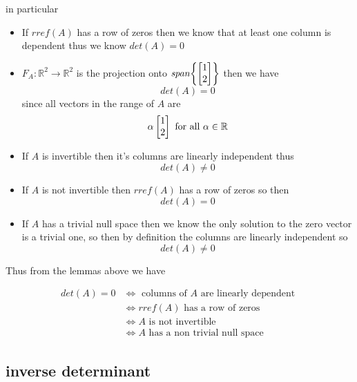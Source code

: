 \documentclass[11pt]{book}
\begin{document}
in particular 
\begin{itemize}
    \item If $\mathit{rref} \left(A\right) $ has a row of zeros then we know that at least one column is dependent thus we know $\boxed{\mathit{det} \left(A\right) = 0}$ 
    \item $F_{A}  : \mathbb{R} ^2  \to \mathbb{R} ^2  $ is the projection onto $\mathit{span} {\left\{ \begin{bmatrix} 1 \\ 2 \end{bmatrix}  \right\} } $ then we have 
        \[
        \boxed{\mathit{det} \left(A\right) = 0 }
        \]
    since all vectors in the range of $A$ are
    \[
    \alpha \begin{bmatrix} 1 \\ 2 \end{bmatrix} \text{ for all  } \alpha \in \mathbb{R} 
    \]
    \item If $A$ is invertible then it's columns are linearly independent thus 
        \[
            \boxed{\mathit{det} \left(A\right) \neq 0}
        \]
    \item If $A$ is not invertible then $\mathit{rref} \left(A\right) $ has a row of zeros so then 
        \[
        \boxed{\mathit{det} \left(A\right) = 0}
        \]
    \item If $A$ has a trivial null space then we know the only solution to the zero vector is a trivial one, so then by definition the columns are linearly independent so 
        \[
        \boxed{\mathit{det} \left(A\right) \neq 0}
        \]
\end{itemize}

Thus from the lemmas above we have 
\begin{thm}\label{thm:determinant_properties_}
    \begin{align*}
        \mathit{det} \left(A\right)= 0 &\Leftrightarrow \text{ columns of $A$ are linearly dependent  } \tag{Important!}\\
                                    &\Leftrightarrow  \mathit{rref} \left(A\right) \text{ has a row of zeros  } \\
                                    & \Leftrightarrow A \text{ is not invertible  } \\
                                    & \Leftrightarrow A \text{ has a non trivial null space  } 
    \end{align*}
\end{thm}

\subsection{inverse determinant }%
\label{sub:inverse_determinant_}
\end{document}
